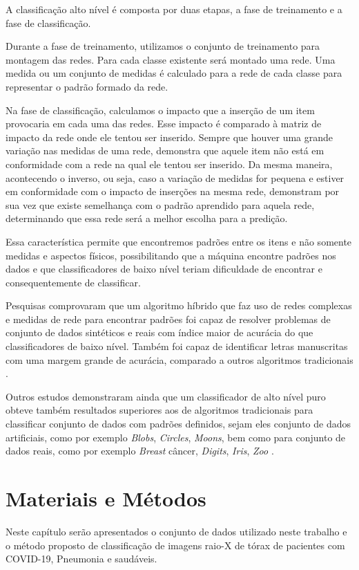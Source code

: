 \documentclass[
12pt,        %
oneside,     %
a4paper,     %
english,       %
brazil        %
%
%
]{ppgca}
\begin{document}
A classificação alto nível é composta por duas etapas, a fase de treinamento e a fase de classificação. 

Durante a fase de treinamento, utilizamos o conjunto de treinamento para montagem das redes. Para cada classe existente será montado uma rede. Uma medida ou um conjunto de medidas é calculado para a rede de cada classe para representar o padrão formado da rede.

Na fase de classificação, calculamos o impacto que a inserção de um item provocaria em cada uma das redes. Esse impacto é comparado à matriz de impacto da rede onde ele tentou ser inserido. Sempre que houver uma grande variação nas medidas de uma rede, demonstra que aquele item não está em conformidade com a rede na qual ele tentou ser inserido. Da mesma maneira, acontecendo o inverso, ou seja, caso a variação de medidas for pequena e estiver em conformidade com o impacto de inserções na mesma rede, demonstram por sua vez que existe semelhança com o padrão aprendido para aquela rede, determinando que essa rede será a melhor escolha para a predição.

Essa característica permite que encontremos padrões entre os itens e não somente medidas e aspectos físicos, possibilitando que a máquina encontre padrões nos dados e que classificadores de baixo nível teriam dificuldade de encontrar e consequentemente de classificar.

Pesquisas comprovaram que um algoritmo híbrido que faz uso de redes complexas e medidas de rede para encontrar padrões foi capaz de resolver problemas de conjunto de dados sintéticos e reais com índice maior de acurácia do que classificadores de baixo nível. Também foi capaz de identificar letras manuscritas com uma margem grande de acurácia, comparado a outros algoritmos tradicionais \cite{silva2012a}.

Outros estudos demonstraram ainda que um classificador de alto nível puro obteve também resultados superiores aos de algoritmos tradicionais para classificar conjunto de dados com padrões definidos, sejam eles conjunto de dados artificiais, como por exemplo \textit{Blobs}, \textit{Circles}, \textit{Moons}, bem como para conjunto de dados reais, como por exemplo \textit{Breast} câncer, \textit{Digits}, \textit{Iris}, \textit{Zoo} \cite{Colliri2018}.


\chapter{Materiais e Métodos}
Neste capítulo serão apresentados o conjunto de dados utilizado neste trabalho e o método proposto de classificação de imagens raio-X de tórax de pacientes com COVID-19, Pneumonia e saudáveis.
\end{document}
